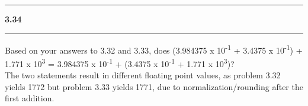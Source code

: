 \documentclass[11pt]{article}
\newcommand\question[2]{\vspace{.25in}\hrule\textbf{#1 #2}\vspace{.5em}\hrule\vspace{.10in}}
\begin{document}
\question{3.34}{} 
Based on your answers to 3.32 and 3.33, does (3.984375 x 10\textsuperscript{-1} + 3.4375 x 10\textsuperscript{-1}) + 1.771 x 10\textsuperscript{3} = 3.984375 x 10\textsuperscript{-1} + (3.4375 x 10\textsuperscript{-1} + 1.771 x 10\textsuperscript{3})?\\[1em]

The two statements result in different floating point values, as problem 3.32 yields 1772 but problem 3.33 yields 1771, due to normalization/rounding after the first addition.
\end{document}
